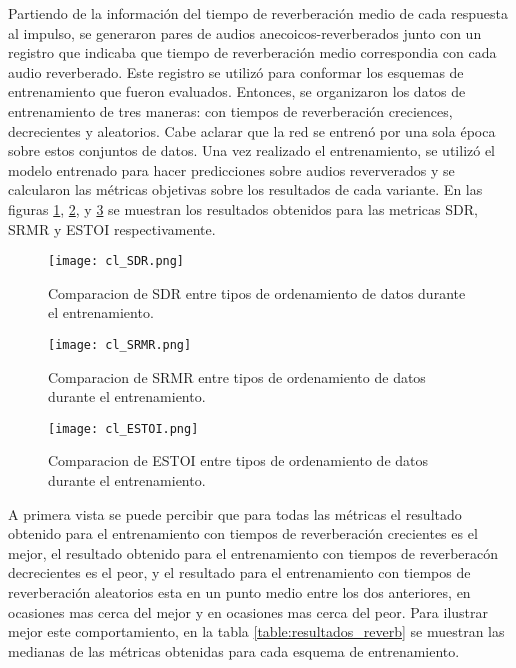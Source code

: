 Partiendo de la información del tiempo de reverberación medio de cada respuesta al impulso, se generaron pares de audios anecoicos-reverberados junto con un registro que indicaba que tiempo de reverberación medio correspondia con cada audio reverberado. Este registro se utilizó para conformar los esquemas de entrenamiento que fueron evaluados. Entonces, se organizaron los datos de entrenamiento de tres maneras: con tiempos de reverberación creciences, decrecientes y aleatorios. Cabe aclarar que la red se entrenó por una sola época sobre estos conjuntos de datos. Una vez realizado el entrenamiento, se utilizó el modelo entrenado para hacer predicciones sobre audios reververados y se calcularon las métricas objetivas sobre los resultados de cada variante. En las figuras \ref{fig:cl_sdr}, \ref{fig:cl_srmr}, y \ref{fig:cl_estoi} se muestran los resultados obtenidos para las metricas SDR, SRMR y ESTOI respectivamente. 

\begin{figure}[H]
	\centering{}
	\texttt{[image: cl\_SDR.png]}
	\caption{Comparacion de SDR entre tipos de ordenamiento de datos durante el entrenamiento.}
	\label{fig:cl_sdr}
\end{figure}

\begin{figure}[H]
	\centering{}
	\texttt{[image: cl\_SRMR.png]}
	\caption{Comparacion de SRMR entre tipos de ordenamiento de datos durante el entrenamiento.}
	\label{fig:cl_srmr}
\end{figure}

\begin{figure}[H]
	\centering{}
	\texttt{[image: cl\_ESTOI.png]}
	\caption{Comparacion de ESTOI entre tipos de ordenamiento de datos durante el entrenamiento.}
	\label{fig:cl_estoi}
\end{figure}

A primera vista se puede percibir que para todas las métricas el resultado obtenido para el entrenamiento con tiempos de reverberación crecientes es el mejor, el resultado obtenido para el entrenamiento con tiempos de reverberacón decrecientes es el peor, y el resultado para el entrenamiento con tiempos de reverberación aleatorios esta en un punto medio entre los dos anteriores, en ocasiones mas cerca del mejor y en ocasiones mas cerca del peor. Para ilustrar mejor este comportamiento, en la tabla \ref{table:resultados_reverb} se muestran las medianas de las métricas obtenidas para cada esquema de entrenamiento. 


